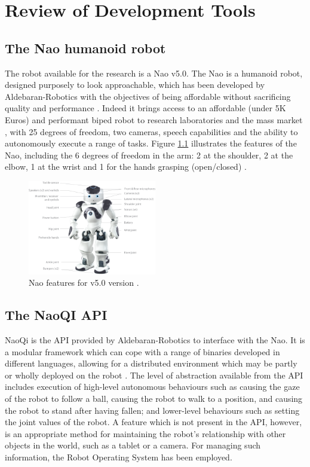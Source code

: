\chapter{Review of Development Tools } \label{chap:tools}

\section{The Nao humanoid robot}

The robot available for the research is a Nao v5.0. The Nao is a humanoid robot, designed purposely to look approachable, which has been developed by Aldebaran-Robotics with the objectives of being affordable without sacrificing quality and performance \cite{gouaillier2008nao}. Indeed it brings access to an affordable (under 5K Euros) and performant biped robot to research laboratories and the mass market \cite{shamsuddin2011humanoid}, with 25 degrees of freedom, two cameras, speech capabilities and the ability to autonomously execute a range of tasks. Figure \ref{fig:nao_robot} illustrates the features of the Nao, including the 6 degrees of freedom in the arm: 2 at the shoulder, 2 at the elbow, 1 at the wrist and 1 for the hands grasping (open/closed) \cite{gouaillier2008nao}.

\begin{figure}[h!]
        \centering
        \includegraphics[width=0.5\textwidth]{figures/naoRobot.png}
        \caption{Nao features for v5.0 version \cite{aldebaran}.}
        \label{fig:nao_robot}
\end{figure}

\section{The NaoQI API}

NaoQi is the API provided by Aldebaran-Robotics to interface with the Nao. It is a modular
framework which can cope with a range of binaries developed in different languages, allowing
for a distributed environment which may be partly or wholly deployed on the robot \cite{gouaillier2008nao}. The level of abstraction available from the API includes execution of high-level autonomous behaviours such as causing the gaze of the robot to follow a ball, causing the robot to walk to a position, and causing the robot to stand after having fallen; and lower-level behaviours such as setting the joint values of the robot. A feature which is not present in the API, however, is an appropriate method for maintaining the robot’s relationship with other objects in the world, such as a tablet or a camera. For managing such information, the Robot Operating System has been employed.

